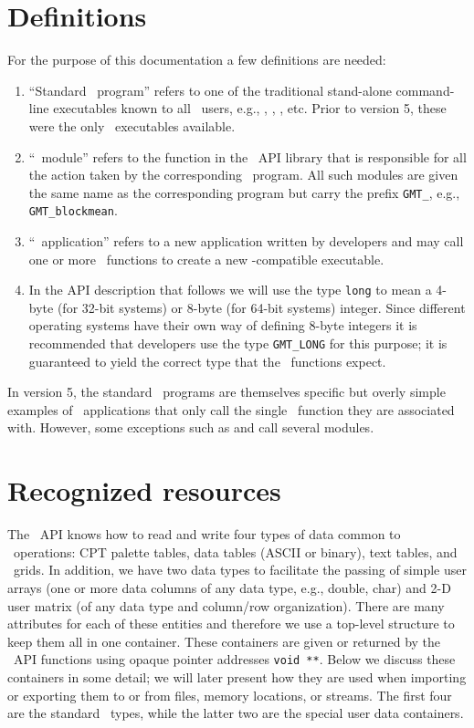 \documentclass{report}
\begin{document}
\section{Definitions}

For the purpose of this documentation a few definitions are needed:

\begin{enumerate}
\item ``Standard \GMT\ program'' refers to one of the traditional stand-alone command-line
executables known to all \GMT\ users, e.g., , ,
, etc.  Prior to version 5, these were the only \GMT\ executables available.
\item ``\GMT\ module'' refers to the function in the \GMT\ API
library that is responsible for all the action taken by the corresponding \GMT\ program.  All
such modules are given the same name as the corresponding program but carry the
prefix \texttt{GMT\_}, e.g., \texttt{GMT\_blockmean}.
\item ``\GMT\ application'' refers to a new application written by developers
and may call one or more \GMT\ functions to create a new \GMT-compatible executable.
\item In the API description that follows we will use the type \texttt{long} to mean
a 4-byte (for 32-bit systems) or 8-byte (for 64-bit systems) integer.  Since different
operating systems have their own way of defining 8-byte integers it is recommended that
developers use the type \texttt{GMT\_LONG} for this purpose; it is guaranteed to yield
the correct type that the \GMT\ functions expect.
\end{enumerate}
In version 5, the standard \GMT\ programs are themselves specific but overly simple examples
of \GMT\ applications that only call the single \GMT\ function they are associated with.
However, some exceptions such as  and  call several modules.

\section{Recognized resources}

The \GMT\ API knows how to read and write four types of data common to \GMT\ operations:
CPT palette tables, data tables (ASCII or binary), text tables, and \GMT\ grids.
In addition, we have two data types to facilitate the passing of simple user arrays (one or more data columns
of any data type, e.g., double, char) and 2-D user matrix (of any data type and column/row organization).
There are many attributes for each of these entities and therefore we use a top-level structure
to keep them all in one container.  These containers are given or returned by the \GMT\ API
functions using opaque pointer addresses \texttt{void **}.  Below we discuss these containers in some detail; we
will later present how they are used when importing or exporting them to or from files,
memory locations, or streams.  The first four are the standard \GMT\ types, while the latter two are the
special user data containers.
\end{document}
